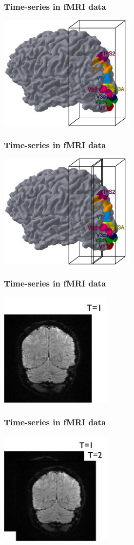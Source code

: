 \documentclass{beamer}
\begin{document}
\begin{frame}
\frametitle{Time-series in fMRI data}
\includegraphics[height=5.7cm]{figures/brain_w_acquisition_vol}
\end{frame}

\begin{frame}
\frametitle{Time-series in fMRI data}
\includegraphics[height=5.7cm]{figures/brain_w_acquisition_vol_n_slice}
\end{frame}

\begin{frame}
\frametitle{Time-series in fMRI data}
\includegraphics[height=5.7cm]{figures/t1}
\end{frame}

\begin{frame}
\frametitle{Time-series in fMRI data}
\includegraphics[height=5.7cm]{figures/t1_2}
\end{frame}
\end{document}
